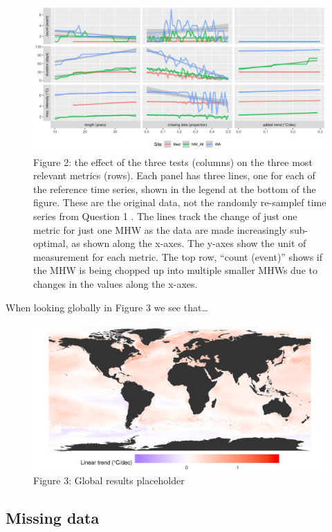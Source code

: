 \documentclass[]{article}
\begin{document}
\begin{figure}
\centering
\includegraphics{../output/effect_event.png}
\caption{Figure 2: the effect of the three tests (columns) on the three
most relevant metrics (rows). Each panel has three lines, one for each
of the reference time series, shown in the legend at the bottom of the
figure. These are the original data, not the randomly re-samplef time
series from Question 1 . The lines track the change of just one metric
for just one MHW as the data are made increasingly sub-optimal, as shown
along the x-axes. The y-axes show the unit of measurement for each
metric. The top row, ``count (event)'' shows if the MHW is being chopped
up into multiple smaller MHWs due to changes in the values along the
x-axes.}
\end{figure}

When looking globally in Figure 3 we see that\ldots{}

\begin{figure}
\centering
\includegraphics{../output/global_dec_trend_plot.png}
\caption{Figure 3: Global results placeholder}
\end{figure}

\hypertarget{missing-data}{%
\subsection{Missing data}\label{missing-data}}
\end{document}
